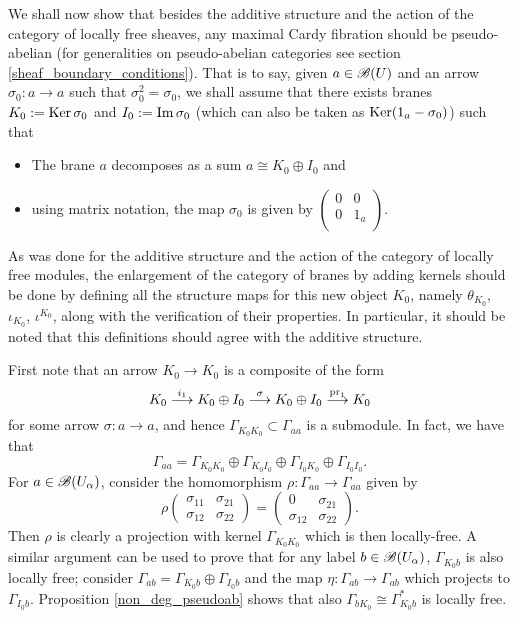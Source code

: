 We shall now show that besides the additive structure and the action of the category of locally free sheaves, any maximal Cardy fibration should be pseudo-abelian (for generalities on pseudo-abelian categories see section \ref{sheaf_boundary_conditions}). That is to say, given $a\in \mathscr{B}(U)$ and an arrow $\sigma_0 :a\to a$ such that $\sigma_0^2=\sigma_0$, we shall assume that there exists branes $K_0:=\operatorname{Ker}\sigma_0$ and $I_0:=\operatorname{Im}\sigma_0$ (which can also be taken as $\operatorname{Ker}(1_a-\sigma_0 )$) such that
\begin{itemize}
\item The brane $a$ decomposes as a sum $a\cong K_0 \oplus I_0$ and
\item using matrix notation, the map $\sigma_0$ is given by $\left (\begin{smallmatrix} 0 & 0 \\ 0 & 1_a \\ \end{smallmatrix} \right )$.
\end{itemize}
 As was done for the additive structure and the action of the category of locally free modules, the enlargement of the category of branes by adding kernels should be done by defining all the structure maps for this new object $K_0$, namely $\theta_{K_0}$, $\iota_{K_0}$, $\iota^{K_0}$, along with the verification of their properties. In particular, it should be noted that this definitions should agree with the additive structure.

First note that an arrow $K_0\to K_0$ is a composite of the form
$$K_0\stackrel{i_1}{\longrightarrow}K_0\oplus I_0\stackrel{\sigma}{\longrightarrow}K_0\oplus I_0\stackrel{\operatorname{pr}_1}{\longrightarrow}K_0$$
for some arrow $\sigma :a\to a$, and hence $\Gamma_{K_0K_0}\subset \Gamma_{aa}$ is a submodule. In fact, we have that
$$\Gamma_{aa}=\Gamma_{K_0K_0}\oplus \Gamma_{K_0I_0}\oplus \Gamma_{I_0K_0}\oplus \Gamma_{I_0I_0}.$$
For $a\in \mathscr{B}(U_\alpha )$, consider the homomorphism $\rho :\Gamma_{aa}\to \Gamma_{aa}$ given by
$$\rho \left (\begin{smallmatrix} \sigma_{11} & \sigma_{21} \\ \sigma_{12} & \sigma_{22} \end{smallmatrix} \right )=\left (\begin{smallmatrix} 0 & \sigma_{21} \\ \sigma_{12} & \sigma_{22} \end{smallmatrix} \right ).$$
Then $\rho$ is clearly a projection with kernel $\Gamma_{K_0K_0}$ which is then locally-free. A similar argument can be used to prove that for any label $b\in \mathscr{B}(U_\alpha )$, $\Gamma_{K_0b}$ is also locally free; consider $\Gamma_{ab}=\Gamma_{K_0b}\oplus \Gamma_{I_0b}$ and the map $\eta :\Gamma_{ab}\to \Gamma_{ab}$ which projects to $\Gamma_{I_0b}$. Proposition \ref{non_deg_pseudoab} shows that also $\Gamma_{bK_0}\cong \Gamma_{K_0b}^*$ is locally free.


